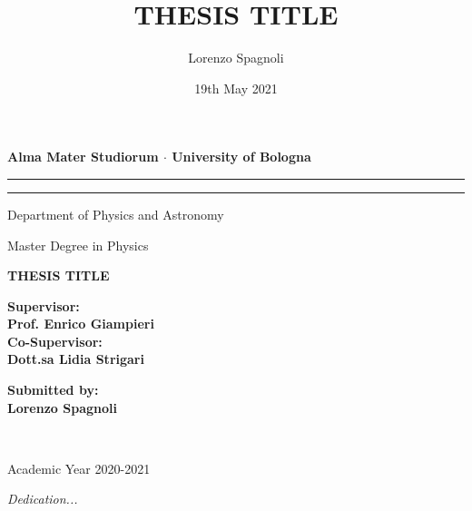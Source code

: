 \documentclass[12pt,a4paper]{report}
\theoremstyle{definition}
\theoremstyle{remark}
\begin{document}
\title{THESIS TITLE}
\author{Lorenzo Spagnoli}
\date{19th May 2021}

\begin{titlepage}
    \begin{center}
        \vspace*{0.2cm}
        {\fontsize{19pt}{20pt}\selectfont \textbf{Alma Mater Studiorum $\cdot$ University of Bologna}\par}

        \par\noindent\rule{\textwidth}{.5pt}
        \rule[.5\baselineskip]{\textwidth}{1.5pt}
        \vspace{0.8cm}

        \normalfont

        Department of Physics and Astronomy

        Master Degree in Physics

        \Large
        \vspace{5cm}
        {\fontsize{22.5pt}{22.5}\textcolor{MyDarkRed}{\textbf{THESIS TITLE}}}


        \vspace{4.5cm}
        \begin{minipage}[t]{0.64\textwidth}
        \begin{flushleft}
        {\fontsize{16pt}{16pt}\textbf{Supervisor:} \\ \textbf{\textcolor{MyDarkRed}{Prof. Enrico Giampieri}}} \\
        {\fontsize{16pt}{16pt}\textbf{Co-Supervisor:} \\ \textbf{\textcolor{MyDarkRed}{Dott.sa Lidia Strigari}}}
        \end{flushleft}
        \end{minipage}
        \begin{minipage}[t]{0.34\textwidth}
        \begin{flushright} \Large
        \textbf{Submitted by:} \\
        \textbf{\textcolor{MyDarkRed}{Lorenzo Spagnoli}} \\
        \end{flushright}
        \end{minipage}\\

        \vfill
        \vspace{0.3cm}
        \small

        Academic Year {\textcolor{MyDarkRed} {2020-2021}}
    \end{center}
\end{titlepage}
\restoregeometry
\vspace*{5cm}
\begin{flushright}
  {\parbox{4.2cm}{\textit{Dedication...}}}
\end{flushright}
\end{document}
